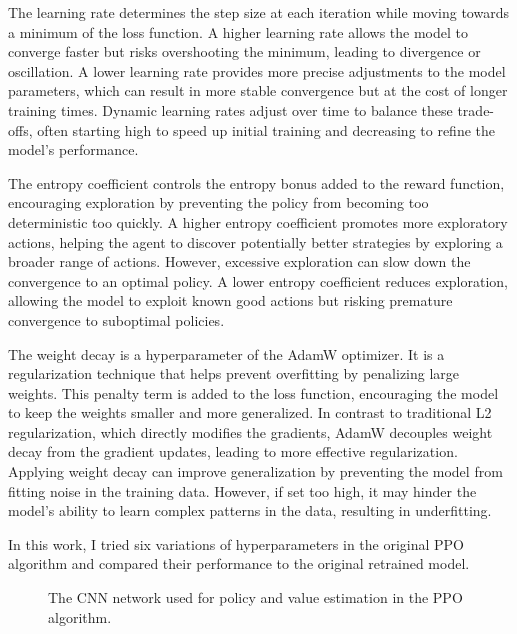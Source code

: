 \documentclass[10pt,conference]{IEEEtran}
\begin{document}
The learning rate determines the step size at each iteration while moving towards a minimum of the loss function. A higher learning rate allows the model to converge faster but risks overshooting the minimum, leading to divergence or oscillation. A lower learning rate provides more precise adjustments to the model parameters, which can result in more stable convergence but at the cost of longer training times. Dynamic learning rates adjust over time to balance these trade-offs, often starting high to speed up initial training and decreasing to refine the model's performance.

The entropy coefficient controls the entropy bonus added to the reward function, encouraging exploration by preventing the policy from becoming too deterministic too quickly. A higher entropy coefficient promotes more exploratory actions, helping the agent to discover potentially better strategies by exploring a broader range of actions. However, excessive exploration can slow down the convergence to an optimal policy. A lower entropy coefficient reduces exploration, allowing the model to exploit known good actions but risking premature convergence to suboptimal policies.

The weight decay is a hyperparameter of the AdamW optimizer. It is a regularization technique that helps prevent overfitting by penalizing large weights. This penalty term is added to the loss function, encouraging the model to keep the weights smaller and more generalized. In contrast to traditional L2 regularization, which directly modifies the gradients, AdamW decouples weight decay from the gradient updates, leading to more effective regularization. Applying weight decay can improve generalization by preventing the model from fitting noise in the training data. However, if set too high, it may hinder the model's ability to learn complex patterns in the data, resulting in underfitting.

In this work, I tried six variations of hyperparameters in the original PPO algorithm and compared their performance to the original retrained model.



\begin{figure}[h]
  \centering
  \caption{The CNN network used for policy and value estimation in the PPO algorithm.}
  \label{fig:cnn}
\end{figure}
\end{document}
